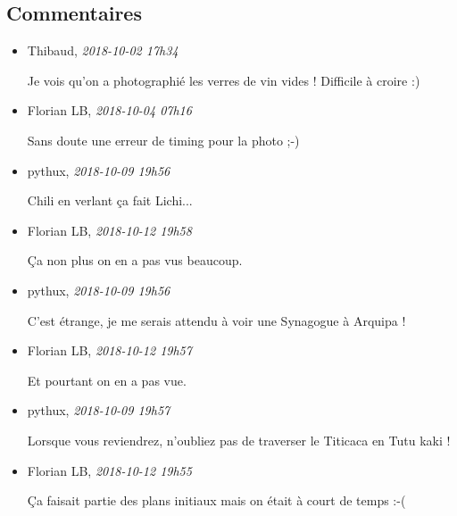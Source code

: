 \documentclass[]{article}
\date{}
\begin{document}
\hypertarget{commentaires}{%
\subsection{Commentaires}\label{commentaires}}

\begin{itemize}
\item
  Thibaud, \emph{2018-10-02 17h34}

  Je vois qu'on a photographié les verres de vin vides ! Difficile à
  croire :)
\item
  Florian LB, \emph{2018-10-04 07h16}

  Sans doute une erreur de timing pour la photo ;-)
\item
  pythux, \emph{2018-10-09 19h56}

  Chili en verlant ça fait Lichi...
\item
  Florian LB, \emph{2018-10-12 19h58}

  Ça non plus on en a pas vus beaucoup.
\item
  pythux, \emph{2018-10-09 19h56}

  C'est étrange, je me serais attendu à voir une Synagogue à Arquipa !
\item
  Florian LB, \emph{2018-10-12 19h57}

  Et pourtant on en a pas vue.
\item
  pythux, \emph{2018-10-09 19h57}

  Lorsque vous reviendrez, n'oubliez pas de traverser le Titicaca en
  Tutu kaki !
\item
  Florian LB, \emph{2018-10-12 19h55}

  Ça faisait partie des plans initiaux mais on était à court de temps
  :-(
\end{itemize}
\end{document}
